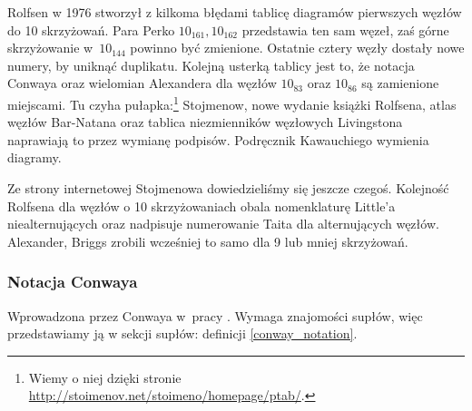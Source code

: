 Rolfsen w 1976 stworzył z kilkoma błędami tablicę diagramów pierwszych węzłów do 10 skrzyżowań.
Para Perko $10_{161}, 10_{162}$ przedstawia ten sam węzeł, zaś górne skrzyżowanie w~$10_{144}$ powinno być zmienione.
Ostatnie cztery węzły dostały nowe numery, by uniknąć duplikatu.
Kolejną usterką tablicy jest to, że notacja Conwaya oraz wielomian Alexandera dla węzłów $10_{83}$ oraz $10_{86}$ są zamienione miejscami.
Tu czyha pułapka:\footnote{Wiemy o niej dzięki stronie \url{http://stoimenov.net/stoimeno/homepage/ptab/}.} Stojmenow, nowe wydanie książki Rolfsena, atlas węzłów Bar-Natana oraz tablica niezmienników węzłowych Livingstona naprawiają to przez wymianę podpisów.
Podręcznik Kawauchiego wymienia diagramy.

Ze strony internetowej Stojmenowa dowiedzieliśmy się jeszcze czegoś.
Kolejność Rolfsena dla węzłów o 10 skrzyżowaniach obala nomenklaturę Little'a niealternujących oraz nadpisuje numerowanie Taita dla alternujących węzłów.
Alexander, Briggs zrobili wcześniej to samo dla 9 lub mniej skrzyżowań.

\subsubsection{Notacja Conwaya}
Wprowadzona przez Conwaya w~pracy \cite{conway70}.
Wymaga znajomości supłów, więc przedstawiamy ją w sekcji supłów: definicji \ref{conway_notation}.

